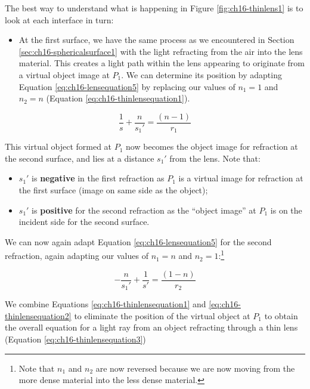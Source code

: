 \documentclass[
]{book}
\providecommand{\tightlist}{%
  \setlength{\itemsep}{0pt}\setlength{\parskip}{0pt}}
\begin{document}
The best way to understand what is happening in Figure \ref{fig:ch16-thinlens1} is to look at each interface in turn:

\begin{itemize}
\tightlist
\item
  At the first surface, we have the same process as we encountered in Section \ref{sec:ch16-sphericalsurface1} with the light refracting from the air into the lens material. This creates a light path within the lens appearing to originate from a virtual object image at \(P_1\). We can determine its position by adapting Equation \eqref{eq:ch16-lensequation5} by replacing our values of \(n_1 = 1\) and \(n_2 = n\) (Equation \eqref{eq:ch16-thinlensequation1}).
\end{itemize}

\begin{equation}
\frac{1}{s} + \frac{n}{s_1'} = \frac{(n - 1)}{r_1}
\label{eq:ch16-thinlensequation1}
\end{equation}

This virtual object formed at \(P_1\) now becomes the object image for refraction at the second surface, and lies at a distance \(s_1'\) from the lens. Note that:

\begin{itemize}
\tightlist
\item
  \(s_1'\) is \textbf{negative} in the first refraction as \(P_1\) is a virtual image for refraction at the first surface (image on same side as the object);
\item
  \(s_1'\) is \textbf{positive} for the second refraction as the ``object image'' at \(P_1\) is on the incident side for the second surface.
\end{itemize}

We can now again adapt Equation \eqref{eq:ch16-lensequation5} for the second refraction, again adapting our values of \(n_1 = n\) and \(n_2 = 1\):\footnote{Note that \(n_1\) and \(n_2\) are now reversed because we are now moving from the more dense material into the less dense material.}

\begin{equation}
-\frac{n}{s_1'} + \frac{1}{s'} = \frac{(1 - n)}{r_2}
\label{eq:ch16-thinlensequation2}
\end{equation}

We combine Equations \eqref{eq:ch16-thinlensequation1} and \eqref{eq:ch16-thinlensequation2} to eliminate the position of the virtual object at \(P_1\) to obtain the overall equation for a light ray from an object refracting through a thin lens (Equation \eqref{eq:ch16-thinlensequation3})
\end{document}
